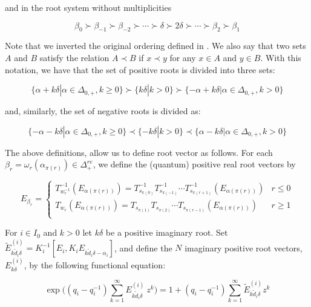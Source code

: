 \documentclass[12pt]{amsart}
\numberwithin{equation}{section}
\begin{document}
and in the root system without multiplicities

$$ \beta_{0} \succ \beta_{-1} \succ \beta_{-2} \succ \cdots \succ \delta \succ 2\delta \succ \cdots \succ \beta_2 \succ \beta_1  $$

\vspace{0.3cm} 

Note that we inverted the original ordering defined in \cite{D}. We also say that two sets $A$ and $B$ satisfy the relation $A \prec B$ if $x\prec y$ for any $x\in A$ and $y\in B$. With this notation, we have that the set of positive roots is divided into three sets: 

$$ \{ \alpha + k\delta | \alpha \in \Delta_{0,+}, k\geq 0 \} \succ \{ k\delta | k > 0 \} \succ \{ -\alpha + k\delta | \alpha \in \Delta_{0,+}, k > 0 \} $$

\vspace{0.3cm} 

and, similarly, the set of negative roots is divided as:

$$ \{ -\alpha - k\delta | \alpha \in \Delta_{0,+}, k\geq 0 \} \prec \{ -k\delta | k > 0 \} \prec \{ \alpha - k\delta | \alpha \in \Delta_{0,+}, k > 0 \} $$

\vspace{4mm}

The above definitions, allow us to define root vector as follows. For each $\beta_r = \omega_r(\alpha_{\pi(r)}) \in \Delta_{+}^{re}$, we define the (quantum) positive real root vectors by 

$$ E_{\beta_r} = \begin{cases}
    T_{w_r^{-1}}^{-1}(E_{\alpha(\pi(r))}) = T_{s_{\pi(0)}}^{-1}T_{s_{\pi(-1)}}^{-1}\cdots T_{s_{\pi(r+1)}}^{-1}(E_{\alpha(\pi(r))}) & r\leq 0 \\
    T_{w_r}(E_{\alpha(\pi(r))}) = T_{s_{\pi(1)}}T_{s_{\pi(2)}} \cdots T_{s_{\pi(r-1)}}(E_{\alpha(\pi(r))}) & r \geq 1 \\
\end{cases}  $$ 

\vspace{5mm}

For $i \in I_0$ and $k>0$ let $k\delta$ be a positive imaginary root. Set $\tilde{E}_{k\tilde{d}_i\delta}^{(i)} = K_i^{-1}[E_i, 
K_iE_{k\tilde{d}_i\delta - \alpha_i}]$, and define the $N$ imaginary positive root vectors, $E_{k\delta}^{(i)}$, by the following functional equation: 

$$ \exp\Big( (q_i - q_i^{-1}) \sum_{k = 1}^{\infty} E_{k\tilde{d}_i\delta}^{(i)}\ z^k \Big) = 1 + (q_i - q_i^{-1})\sum_{k=1}^{\infty} \tilde{E}_{k\tilde{d}_i\delta}^{(i)}z^k $$
\end{document}
